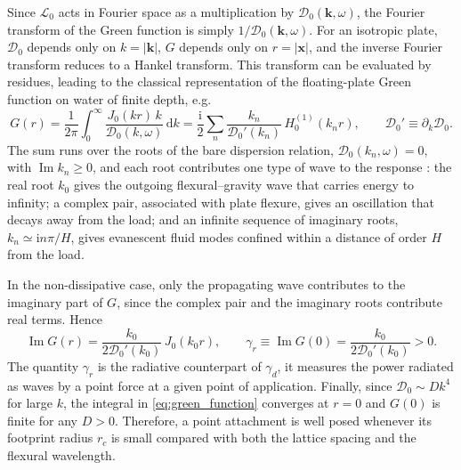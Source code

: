 Since $\mathcal{L}_0$ acts in Fourier space as a multiplication by $\mathcal{D}_0(\mathbf{k},\omega)$, the Fourier transform of the Green function is simply $1/\mathcal{D}_0(\mathbf{k},\omega)$. For an isotropic plate, $\mathcal{D}_0$ depends only on $k=|\mathbf{k}|$, $G$ depends only on $r=|\mathbf{x}|$, and the inverse Fourier transform reduces to a Hankel transform. This transform can be evaluated by residues, leading to the classical representation of the floating-plate Green function on water of finite depth, e.g. \cite{evans2003wave}
\begin{equation}
  \label{eq:green_function}
  G(r)=\frac{1}{2\pi}\int_0^\infty
       \frac{J_0(kr)\,k}{\mathcal{D}_0(k,\omega)}\,\mathrm{d}k
      =\frac{\mathrm{i}}{2}\sum_{n}
       \frac{k_n}{\mathcal{D}_0'(k_n)}\,H_0^{(1)}(k_nr),
  \qquad \mathcal{D}_0'\equiv\partial_k\mathcal{D}_0.
\end{equation}
The sum runs over the roots of the bare dispersion relation, $\mathcal{D}_0(k_n,\omega)=0$, with $\operatorname{Im}k_n\ge0$, and each root contributes one type of wave to the response \citep{fox1994oblique}: the real root $k_0$ gives the outgoing flexural--gravity wave that carries energy to infinity; a complex pair, associated with plate flexure, gives an oscillation that decays away from the load; and an infinite sequence of imaginary roots, $k_n\simeq\mathrm{i}n\pi/H$, gives evanescent fluid modes confined within a distance of order $H$ from the load.

In the non-dissipative case, only the propagating wave contributes to the imaginary part of $G$, since the complex pair and the imaginary roots contribute real terms. Hence
\begin{equation}
  \label{eq:ImG}
  \operatorname{Im}G(r)=\frac{k_0}{2\mathcal{D}_0'(k_0)}\,J_0(k_0r),
  \qquad
  \gamma_r\equiv\operatorname{Im}G(0)=\frac{k_0}{2\mathcal{D}_0'(k_0)}>0.
\end{equation}
The quantity $\gamma_r$ is the radiative counterpart of $\gamma_d$, it measures the power radiated as waves by a point force at a given point of application. Finally, since $\mathcal{D}_0\sim Dk^4$ for large $k$, the integral in \eqref{eq:green_function} converges at $r=0$ and $G(0)$ is finite for any $D>0$. Therefore, a point attachment is well posed whenever its footprint radius $r_c$ is small compared with both the lattice spacing and the flexural wavelength. 


